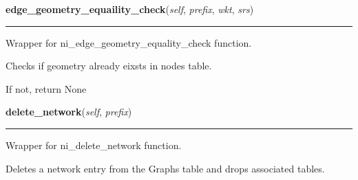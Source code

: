    \label{nx_pgnet:nisql:edge_geometry_equaility_check}

    \vspace{0.5ex}

\hspace{.8\funcindent}\begin{boxedminipage}{\funcwidth}

    \raggedright \textbf{edge\_geometry\_equaility\_check}(\textit{self}, \textit{prefix}, \textit{wkt}, \textit{srs})

    \vspace{-1.5ex}

    \rule{\textwidth}{0.5\fboxrule}
\setlength{\parskip}{2ex}
    Wrapper for ni\_edge\_geometry\_equality\_check function.

    Checks if geometry already eixsts in nodes table.

    If not, return None

\setlength{\parskip}{1ex}
    \end{boxedminipage}

    \label{nx_pgnet:nisql:delete_network}

    \vspace{0.5ex}

\hspace{.8\funcindent}\begin{boxedminipage}{\funcwidth}

    \raggedright \textbf{delete\_network}(\textit{self}, \textit{prefix})

    \vspace{-1.5ex}

    \rule{\textwidth}{0.5\fboxrule}
\setlength{\parskip}{2ex}
    Wrapper for ni\_delete\_network function.

    Deletes a network entry from the Graphs table and drops associated 
    tables.

\setlength{\parskip}{1ex}
    \end{boxedminipage}



